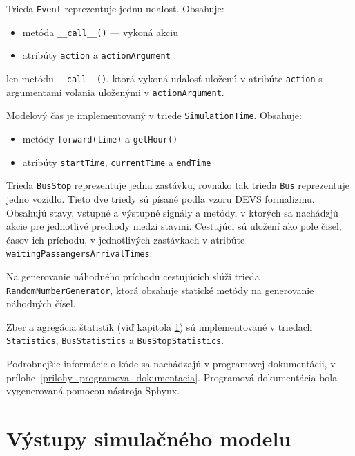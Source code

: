 Trieda \texttt{Event} reprezentuje jednu udalosť.
Obsahuje:
\begin{itemize}
  \item metóda \texttt{\_\_call\_\_()} --- vykoná akciu
  \item atribúty \texttt{action} a \texttt{actionArgument}
\end{itemize}

len metódu \texttt{\_\_call\_\_()}, ktorá vykoná udalosť uloženú v atribúte \texttt{action} s argumentami volania uloženými v \texttt{actionArgument}.

Modelový čas je implementovaný v triede \texttt{SimulationTime}.
Obsahuje:
\begin{itemize}
  \item metódy \texttt{forward(time)} a \texttt{getHour()}
  \item atribúty \texttt{startTime}, \texttt{currentTime} a \texttt{endTime}
\end{itemize}

Trieda \texttt{BusStop} reprezentuje jednu zastávku, rovnako tak trieda \texttt{Bus} reprezentuje jedno vozidlo.
Tieto dve triedy sú písané podľa vzoru DEVS formalizmu. Obsahujú stavy, vstupné a výstupné signály a metódy, v ktorých sa nachádzjú akcie pre jednotlivé prechody medzi stavmi.
Cestujúci sú uložení ako pole čisel, časov ich príchodu, v jednotlivých zastávkach v atribúte \texttt{waitingPassangersArrivalTimes}.

Na generovanie náhodného príchodu cestujúcich slúži trieda \texttt{RandomNumberGenerator}, ktorá obsahuje statické metódy na generovanie náhodných čísel.

Zber a agregácia štatistík (viď kapitola \ref{vystupy_simulacneho_modelu}) sú implementované v triedach \texttt{Statistics}, \texttt{BusStatistics} a \texttt{BusStopStatistics}.

Podrobnejšie informácie o kóde sa nachádzajú v programovej dokumentácii, v prílohe~\ref{prilohy_programova_dokumentacia}.
Programová dokumentácia bola vygenerovaná pomocou nástroja Sphynx.

\section{Výstupy simulačného modelu}
\label{vystupy_simulacneho_modelu}

